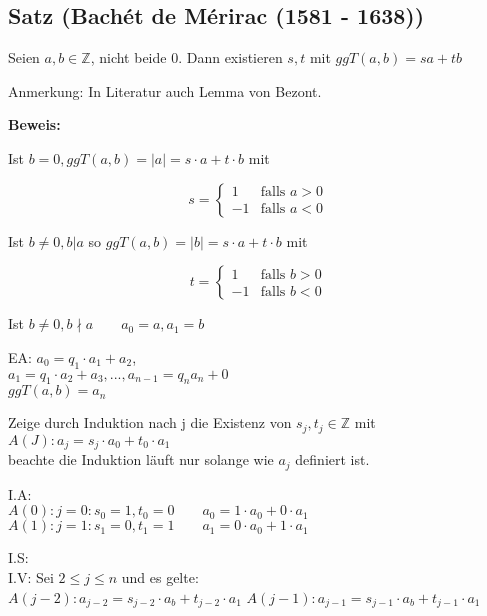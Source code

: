 \documentclass[a4paper, 12pt, twoside] {article}
\begin{document}

\subsection{Satz (Bachét de Mérirac (1581 - 1638))} %

Seien $a, b \in \mathbb{Z}$, nicht beide $0$. Dann existieren  $s, t$ mit $ggT(a, b) = sa + tb$

Anmerkung: In Literatur  auch Lemma von Bezont.

\textbf{Beweis:}

Ist $b = 0, ggT(a, b) = |a| = s \cdot a + t \cdot b$ mit

\[ s =
  \begin{cases}
    1 & \text{falls } a > 0 \\
    -1  & \text{falls } a < 0 \
  \end{cases}
\]

Ist $b \neq 0, b | a$ so $ggT(a, b) = |b| = s \cdot a + t \cdot b$ mit

\[ t =
  \begin{cases}
    1 & \text{falls } b > 0 \\
    -1  & \text{falls } b < 0 \
  \end{cases}
\]

Ist $b \neq 0, b \nmid a \qquad a_0 = a, a_1 = b$

EA: $a_0 = q_1 \cdot a_1 + a_2$, \\
$a_1 = q_1 \cdot a_2 + a_3, ... ,a_{n-1} = q_n a_n + 0$ \\
$ggT(a, b) = a_n$

Zeige durch Induktion nach j die Existenz von $s_j, t_j \in \mathbb{Z}$ mit \\
$A(J): a_j = s_j \cdot a_0 + t_0 \cdot a_1$ \\
beachte die Induktion läuft nur solange wie $a_j$ definiert ist.

I.A: \\
$A(0): j = 0: s_0 = 1, t_0 = 0 \qquad a_0 = 1 \cdot a_0 + 0 \cdot a_1$ \checkmark \\

$A(1): j=1: s_1 = 0, t_1 = 1 \qquad a_1 = 0 \cdot a_0 + 1 \cdot a_1$ \checkmark

I.S: \\
I.V: Sei $2 \leq j \leq n$ und es gelte: \\
$A(j-2): a_{j-2} =  s_{j-2} \cdot a_b + t_{j-2} \cdot a_1$
$A(j-1): a_{j-1} =  s_{j-1} \cdot a_b + t_{j-1} \cdot a_1$
\end{document}
